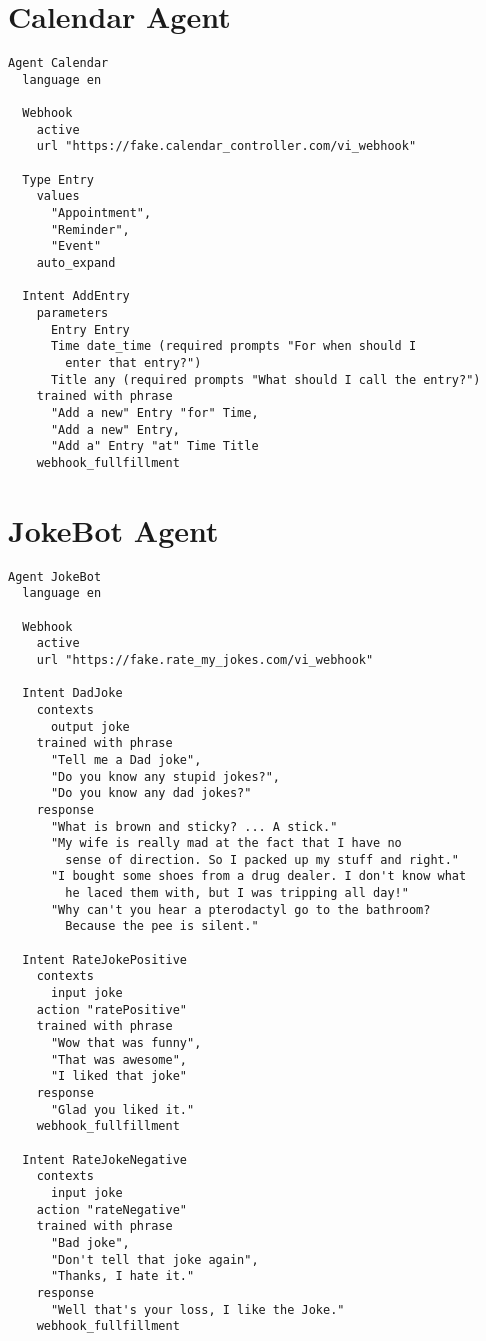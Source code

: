 \section{Calendar Agent}
\label{Calendar Agent DSL}

\begin{lstlisting}
Agent Calendar
  language en

  Webhook
    active
    url "https://fake.calendar_controller.com/vi_webhook"
  
  Type Entry
    values 
      "Appointment", 
      "Reminder", 
      "Event"
    auto_expand
  
  Intent AddEntry
    parameters 
      Entry Entry
      Time date_time (required prompts "For when should I
        enter that entry?")
      Title any (required prompts "What should I call the entry?")
    trained with phrase
      "Add a new" Entry "for" Time,
      "Add a new" Entry,
      "Add a" Entry "at" Time Title
    webhook_fullfillment
\end{lstlisting}
\pagebreak


\section{JokeBot Agent}
\label{JokeBot Agent DSL}

\begin{lstlisting}
Agent JokeBot
  language en
  
  Webhook
    active
    url "https://fake.rate_my_jokes.com/vi_webhook"
  
  Intent DadJoke
    contexts 
      output joke 
    trained with phrase
      "Tell me a Dad joke",
      "Do you know any stupid jokes?",
      "Do you know any dad jokes?"
    response 
      "What is brown and sticky? ... A stick."
      "My wife is really mad at the fact that I have no
        sense of direction. So I packed up my stuff and right."
      "I bought some shoes from a drug dealer. I don't know what
        he laced them with, but I was tripping all day!"
      "Why can't you hear a pterodactyl go to the bathroom?
        Because the pee is silent."
  
  Intent RateJokePositive
    contexts 
      input joke
    action "ratePositive"
    trained with phrase
      "Wow that was funny",
      "That was awesome",
      "I liked that joke"
    response
      "Glad you liked it."
    webhook_fullfillment
  
  Intent RateJokeNegative
    contexts 
      input joke
    action "rateNegative"
    trained with phrase
      "Bad joke",
      "Don't tell that joke again",
      "Thanks, I hate it."
    response
      "Well that's your loss, I like the Joke."
    webhook_fullfillment
\end{lstlisting}
\pagebreak


